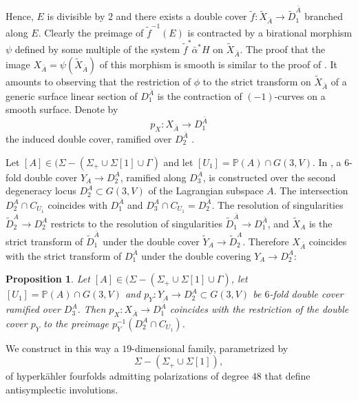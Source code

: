 \documentclass[a4paper,11pt]{amsart}
\newtheorem{prop}[thm]{Proposition}
\theoremstyle{definition}
\numberwithin{equation}{section}
\numberwithin{equation}{section} \theoremstyle{definition}
\begin{document}
 Hence, $E$ is divisible by $2$ and there exists a double cover $\tilde{f}: \tilde{X}_{\bar{A}}\to \tilde{D}_1^{\bar{A}}$ branched along $E$. Clearly the preimage of $\tilde{f}^{-1}(E)$ is contracted by a birational morphism $\psi$ defined by some multiple of the system $\tilde{f}^*\bar{\alpha}^* H$ on $\tilde{X}_{\bar{A}}$. The proof that the image $X_{\bar{A}}=\psi(\tilde{X}_{\bar{A}})$ 
 of this morphism is smooth is similar to the proof of \cite[Proposition 3.1]{EPWcubes}. It amounts to observing that the restriction of $\phi$ to the strict transform on $\tilde{X}_{\bar{A}}$ of a generic surface linear section of $D_1^{\bar{A}}$ 
  is the contraction of $(-1)$-curves on a smooth surface.  
  Denote by
\begin{equation}\label{eq}
p_X\colon X_{\bar{A}}\to D_1^{\bar{A}} 
\end{equation}
the induced double cover, ramified over $D_2^{\bar{A}} $ .

Let $[A]\in (\Sigma-(\Sigma_+\cup \Sigma[1]\cup \Gamma)$ and let
 $[U_1]={{\mathbb{P}}}(A)\cap G(3,V)$.  In \cite[Section 3]{EPWcubes}, a $6$-fold double cover $Y_A\to D_2^A$, ramified along $D_3^A$, is constructed over the second degeneracy locus $D_2^A\subset G(3,V)$ of the Lagrangian subspace $A$.  The intersection $D_2^A\cap C_{U_1}$ coincides with $D_1^{\bar {A}}$ and $D_3^A\cap C_{U_1}=D_2^{\bar {A}}$.  The resolution of singularities  $\tilde {D}_2^A\to D_2^A$ restricts to the resolution of singularities $\tilde {D}_1^{\bar{A}}\to D_1^{\bar{A}}$, and  $\tilde {X}_A$ is the strict transform of $\tilde {D}_1^{\bar{A}}$  under the double cover $\tilde {Y}_A\to \tilde {D}_2^A $.
  Therefore $X_{\bar{A}}$ coincides with the strict transform of $D_1^{\bar{A}}$ under the double covering $Y_A\to D_2^A$:
 
 \begin{prop}\label{compare X_A} Let $[A]\in (\Sigma-(\Sigma_+\cup \Sigma[1]\cup \Gamma)$, 
 let $[U_1]={{\mathbb{P}}}(A)\cap G(3,V)$ and $p_Y: Y_A\to D_2^A\subset G(3,V)$ be $6$-fold double cover ramified over $D_3^A$.  Then  
 $p_X:X_{\bar{A}}\to D_1^{\bar{A}}$ coincides with the restriction of the  double cover $p_Y$ to the preimage $p_Y^{-1}(D_2^A\cap C_{U_1})$.
   \end{prop}
   
   

We construct in this way a $19$-dimensional family, parametrized by  $$\Sigma-(\Sigma_{+}\cup \Sigma[1]),$$ of  hyperk\"ahler fourfolds admitting polarizations of degree $48$ that define antisymplectic involutions. 
\end{document}
